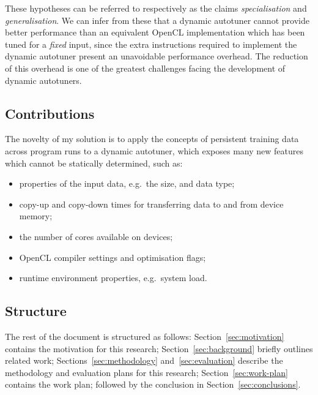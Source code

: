 These hypotheses can be referred to respectively as the claims
\emph{specialisation} and \emph{generalisation}. We can infer from
these that a dynamic autotuner cannot provide better performance than
an equivalent OpenCL implementation which has been tuned for a
\emph{fixed} input, since the extra instructions required to implement
the dynamic autotuner present an unavoidable performance overhead. The
reduction of this overhead is one of the greatest challenges facing
the development of dynamic autotuners.

\subsection{Contributions}

The novelty of my solution is
to apply the concepts of persistent training data across program runs
to a dynamic autotuner, which exposes many new features which cannot
be statically determined, such as:

\begin{itemize}
\itemsep0em
\item properties of the input data, e.g.\ the size, and data type;
\item copy-up and copy-down times for transferring data to and from
  device memory;
\item the number of cores available on devices;
\item OpenCL compiler settings and optimisation flags;
\item runtime environment properties, e.g.\ system load.
\end{itemize}

\subsection{Structure}
The rest of the document is structured as follows:
Section~\ref{sec:motivation} contains the motivation for this
research; Section~\ref{sec:background} briefly outlines related work;
Sections~\ref{sec:methodology} and~\ref{sec:evaluation} describe the
methodology and evaluation plans for this research;
Section~\ref{sec:work-plan} contains the work plan; followed by the
conclusion in Section~\ref{sec:conclusions}.
